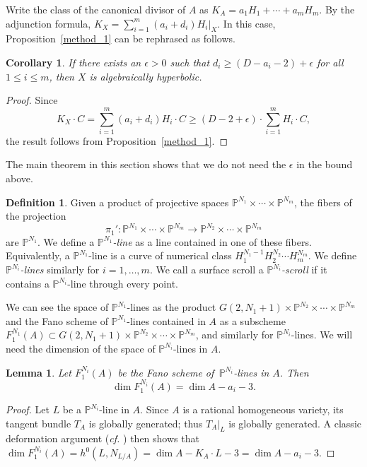 \documentclass[11pt]{amsart}
\numberwithin{equation}{section}
\newtheorem{lemma}[theorem]{Lemma}
\newtheorem{corollary}[theorem]{Corollary}
\theoremstyle{definition}
\newtheorem{definition}[theorem]{Definition}
\theoremstyle{remark}
\renewcommand{\P}{\mathbb{P}}
\newcommand{\lra}{\longrightarrow}
\begin{document}
    Write the class of the canonical divisor of $A$ as $K_A = a_1H_1 + \cdots + a_mH_m$. By the adjunction formula, $K_X = \sum_{i=1}^m (a_i+d_i)H_i|_X$. In this case, Proposition~\ref{method_1} can be rephrased as follows.

\begin{corollary}\label{cor_method_1}
If there exists an $\epsilon > 0$ such that $d_i\ge (D-a_i-2) + \epsilon$ for all $1\le i\le m$, then $X$ is algebraically hyperbolic.
\end{corollary}
\begin{proof}
    Since 
    \[ K_{X}\cdot C = \sum_{i=1}^m (a_i+d_i)H_i\cdot C\ge (D-2+\epsilon)\cdot \sum_{i=1}^m H_i\cdot C, \]
    the result follows from Proposition~\ref{method_1}.
\end{proof}

The main theorem in this section shows that we do not need the $\epsilon$ in the bound above. 

\begin{definition}
    Given a product of projective spaces $\P^{N_1}\times \cdots \times \P^{N_m}$, the fibers of the projection
    \[ \pi_1'\colon \P^{N_1}\times \cdots \times \P^{N_m}\lra \P^{N_2}\times \cdots \times \P^{N_m} \]
    are $\P^{N_1}$. We define a \textit{$\P^{N_1}$-line} as a line contained in one of these fibers. Equivalently, a $\P^{N_1}$-line is a curve of numerical class $H_1^{N_1-1}H_2^{N_2}\cdots H_m^{N_m}$. We define \textit{$\P^{N_i}$-lines} similarly for $i=1,\hdots , m$. We call a surface scroll a \textit{$\P^{N_i}$-scroll} if it contains a $\P^{N_i}$-line through every point.
\end{definition}

We can see the space of $\P^{N_1}$-lines as the product 
$G(2,N_1+1)\times \P^{N_2}\times \cdots \times \P^{N_m}$ and the Fano scheme of $\P^{N_1}$-lines contained in $A$ as a subscheme $F_1^{N_1}(A)\subset G(2,N_1+1)\times \P^{N_2}\times \cdots \times \P^{N_m}$, and similarly for $\P^{N_i}$-lines. We will need the dimension of the space of $\P^{N_i}$-lines in $A$.

\begin{lemma}\label{dim_lines_A}
    Let $F_1^{N_i}(A)$ be the Fano scheme of\, $\P^{N_i}$-lines in $A$. Then 
    \[ \dim F_1^{N_i}(A) = \dim A - a_i - 3. \]
\end{lemma}
\begin{proof}
    Let $L$ be a $\P^{N_i}$-line in $A$. Since $A$ is a rational homogeneous variety, its tangent bundle $T_A$ is globally generated; thus $T_A|_L$ is globally generated. A classic deformation argument  (\textit{cf.} \cite[Theorem 2.6]{HDAG}) then shows that $\dim F_1^{N_i}(A) = h^0(L, N_{L/A}) = \dim A - K_A\cdot L - 3 = \dim A - a_i - 3$.
\end{proof}
\end{document}

